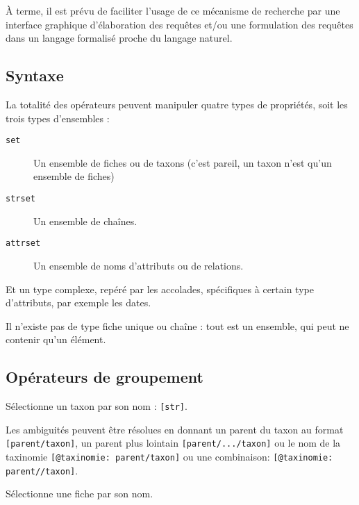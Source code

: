 \documentclass[11pt]{article}
\begin{document}
À terme, il est prévu de faciliter l'usage de ce mécanisme de recherche
par une interface graphique d'élaboration des requêtes et/ou une
formulation des requêtes dans un langage formalisé proche du langage
naturel.

\subsection{Syntaxe}\label{syntaxe}

La totalité des opérateurs peuvent manipuler quatre types de propriétés,
soit les trois types d'ensembles :

\begin{description}
\item[\texttt{set}]
Un ensemble de fiches ou de taxons (c'est pareil, un taxon n'est qu'un
ensemble de fiches)
\item[\texttt{strset}]
Un ensemble de chaînes.
\item[\texttt{attrset}]
Un ensemble de noms d'attributs ou de relations.
\end{description}

Et un type complexe, repéré par les accolades, spécifiques à certain
type d'attributs, par exemple les dates.

Il n'existe pas de type \og fiche unique \fg{} ou \og chaîne \fg{} :
tout est un ensemble, qui peut ne contenir qu'un élément.

\subsection{Opérateurs de groupement}\label{opuxe9rateurs-de-groupement}

\begin{description}
\itemsep1pt\parskip0pt
\item[\texttt{{[} {]}}]
Sélectionne un taxon par son nom : \texttt{{[}str{]}}.
\end{description}

Les ambiguités peuvent être résolues en donnant un parent du taxon au
format \texttt{{[}parent/taxon{]}}, un parent plus lointain
\texttt{{[}parent/.../taxon{]}} ou le nom de la taxinomie
\texttt{{[}@taxinomie: parent/taxon{]}} ou une combinaison:
\texttt{{[}@taxinomie: parent//taxon{]}}.

\begin{description}
\itemsep1pt\parskip0pt
\item[\texttt{" "}]
Sélectionne une fiche par son nom.
\end{description}
\end{document}
